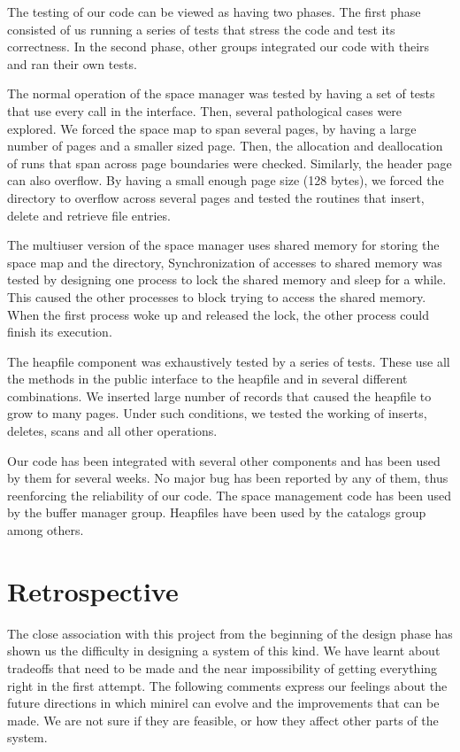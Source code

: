 The testing of our code can be viewed  as having two phases. The first
phase consisted  of us running a series  of tests that stress the code
and  test  its   correctness.   In  the second  phase,   other  groups
integrated our code with theirs and ran their own tests.

The normal operation of the space  manager was tested  by having a set
of tests   that  use every   call in  the  interface.   Then,  several
pathological cases were  explored. We  forced the  space  map to  span
several pages, by having  a large number of pages  and a smaller sized
page. Then, the allocation and  deallocation of runs that span  across
page  boundaries were checked.  Similarly,  the  header page can  also
overflow. By having a small  enough page size  (128 bytes), we  forced
the directory to overflow across several pages and tested the routines
that insert, delete and retrieve file entries.

The multiuser version   of the space manager   uses shared memory  for
storing the  space map and the  directory, Synchronization of accesses
to shared memory   was tested by designing   one process to  lock  the
shared memory and  sleep for a while. This  caused the other processes
to  block trying to access the  shared  memory. When the first process
woke up and  released  the lock, the  other  process could finish  its
execution.

The  heapfile component   was   exhaustively tested  by  a   series of
tests. These  use  all  the methods in  the  public  interface to  the
heapfile and in several  different   combinations. We inserted   large
number  of   records  that  caused  the    heapfile to  grow   to many
pages.  Under such   conditions, we tested    the working of  inserts,
deletes, scans and all other operations.

Our  code has been integrated  with  several other  components and has
been used by them for several weeks.  No major bug has been reported
by any of   them, thus reenforcing  the  reliability of our code.  The
space  management   code   has  been  used     by the  buffer  manager
group. Heapfiles have been used by the catalogs group among others.


\section{Retrospective}

The close  association with this   project from the beginning  of  the
design phase has shown us the difficulty in designing a system of this
kind. We have learnt about tradeoffs that need to be made and the near
impossibility of getting  everything right in  the first attempt.  The
following comments express our feelings about the future directions in
which minirel can evolve and the improvements that can be made. We are
not sure if they are feasible,  or how they  affect other parts of the
system.

